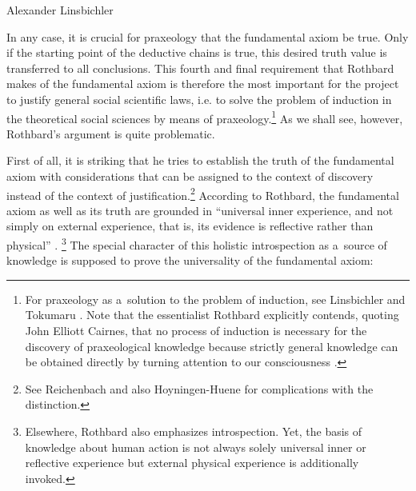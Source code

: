 \begin{artengenv}{Alexander Linsbichler}
			
In any case, it is crucial for praxeology that the fundamental axiom be true. Only if the starting point of the deductive chains is true, this desired truth value is transferred to all conclusions. This fourth and final requirement that Rothbard makes of the fundamental axiom is therefore the most important for the project to justify general social scientific laws, i.e. to solve the problem of induction in the theoretical social sciences by means of praxeology.\footnote{For praxeology as a~solution to the problem of induction, see Linsbichler 
\parencite*[][]{linsbichler_was_2017} %
 and Tokumaru 
\parencite*[][]{tokumaru_poppers_2009}. %
 Note that the essentialist Rothbard explicitly contends, quoting John Elliott Cairnes, that no process of induction is necessary for the discovery of praxeological knowledge because strictly general knowledge can be obtained directly by turning attention to our consciousness 
\parencite[][pp.65–68]{rothbard_praxeology_2011}.%
} As we shall see, however, Rothbard's argument is quite problematic.



First of all, it is striking that he tries to establish the truth of the fundamental axiom with considerations that can be assigned to the context of discovery instead of the context of justification.\footnote{See Reichenbach 
\parencite*[][]{reichenbach_experience_1938} %
 and also Hoyningen-Huene 
\parencite*[][]{hoyningen-huene_context_1987} %
 for complications with the distinction.} According to Rothbard, the fundamental axiom as well as its truth are grounded in ``universal inner experience, and not simply on external experience, that is, its evidence is reflective rather than physical'' 
\parencite[][p.318]{rothbard_defense_1957}.%
\footnote{Elsewhere, Rothbard 
\parencite*[][pp.33–34]{rothbard_praxeology_2011} %
 also emphasizes introspection. Yet, the basis of knowledge about human action is not always solely universal inner or reflective experience but external physical experience is additionally invoked.} The special character of this holistic introspection as a~source of knowledge is supposed to prove the universality of the fundamental axiom:




\end{artengenv}
